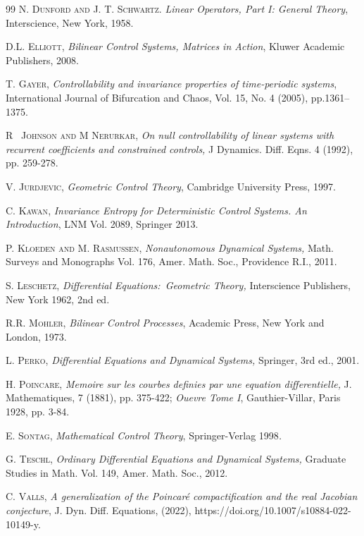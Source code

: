 \documentclass{siamltex}%
\begin{document}
\begin{thebibliography}{99}
\textsc{N. Dunford and J. T. Schwartz.} \emph{Linear Operators,
Part I: General Theory}, Interscience, New York, 1958.

\textsc{D.L. Elliott,} \emph{Bilinear Control Systems,
Matrices in Action}, Kluwer Academic Publishers, 2008.

\textsc{T. Gayer,} \emph{Controllability and invariance
properties of time-periodic systems}, International Journal of Bifurcation and
Chaos, Vol. 15, No. 4 (2005), pp.1361--1375.

\textsc{R \ Johnson and M Nerurkar,} \emph{On null
controllability of linear systems with recurrent coefficients and constrained
controls,} J Dynamics. Diff. Eqns. 4 (1992), pp. 259-278.

\textsc{V. Jurdjevic}, \emph{Geometric Control Theory},
Cambridge University Press, 1997.

\textsc{C. Kawan}, \emph{Invariance Entropy for Deterministic
Control Systems. An Introduction}, LNM Vol. 2089, Springer 2013.

\textsc{P. Kloeden and M. Rasmussen,}\emph{ Nonautonomous
Dynamical Systems,} Math. Surveys and Monographs Vol. 176, Amer. Math. Soc.,
Providence R.I., 2011.

\textsc{S. Leschetz, }\emph{Differential
Equations:\ Geometric Theory,} Interscience Publishers, New York 1962, 2nd ed.

\textsc{R.R. Mohler,} \emph{Bilinear Control Processes},
Academic Press, New York and London, 1973.

\textsc{L. Perko,} \emph{Differential Equations and Dynamical
Systems,} Springer, 3rd ed., 2001.

\textsc{H. Poincare,} \emph{Memoire sur les courbes definies
par une equation differentielle, }J. Mathematiques, 7 (1881), pp. 375-422;
\emph{Ouevre Tome I}, Gauthier-Villar, Paris 1928, pp. 3-84.

\textsc{E. Sontag}, \emph{Mathematical Control Theory},
Springer-Verlag 1998\emph{.}

\textsc{G. Teschl,} \emph{Ordinary Differential Equations and
Dynamical Systems,} Graduate Studies in Math. Vol. 149, Amer. Math. Soc., 2012.

\textsc{C. Valls,} \emph{A generalization of the
Poincar\'{e} compactification and the real Jacobian conjecture}, J. Dyn. Diff.
Equations, (2022), https://doi.org/10.1007/s10884-022-10149-y.
\end{thebibliography}
\end{document}
